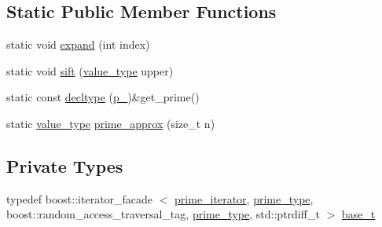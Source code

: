 \subsection*{\-Static \-Public \-Member \-Functions}
\begin{DoxyCompactItemize}
\item 
static void \hyperlink{classyuh_1_1range__detail_1_1prime__iterator_a58131fc2d184d593a3cd6825bca508ee}{expand} (int index)
\item 
static void \hyperlink{classyuh_1_1range__detail_1_1prime__iterator_a8919e76bca867296647318a8e6694b72}{sift} (\hyperlink{classyuh_1_1range__detail_1_1prime__iterator_aaa801ea9fe09398ea8c5beb1324edadf}{value\-\_\-type} upper)
\item 
static const \hyperlink{classyuh_1_1range__detail_1_1prime__iterator_a2f6d1185fb0a9c5645498e79db8e809b}{decltype} (\hyperlink{classyuh_1_1range__detail_1_1prime__iterator_aff6d0a0fbc14123c0fca5a0c05d2e68c}{p\-\_\-})\&get\-\_\-prime()
\item 
static \hyperlink{classyuh_1_1range__detail_1_1prime__iterator_aaa801ea9fe09398ea8c5beb1324edadf}{value\-\_\-type} \hyperlink{classyuh_1_1range__detail_1_1prime__iterator_ace7af2803e2a42c5c17c5e1210e91fa6}{prime\-\_\-approx} (size\-\_\-t n)
\end{DoxyCompactItemize}
\subsection*{\-Private \-Types}
\begin{DoxyCompactItemize}
\item 
typedef boost\-::iterator\-\_\-facade\*
$<$ \hyperlink{classyuh_1_1range__detail_1_1prime__iterator}{prime\-\_\-iterator}, \hyperlink{namespaceyuh_af542f8440602da42322ddb7ea8242336}{prime\-\_\-type}, \*
boost\-::random\-\_\-access\-\_\-traversal\-\_\-tag, \*
\hyperlink{namespaceyuh_af542f8440602da42322ddb7ea8242336}{prime\-\_\-type}, std\-::ptrdiff\-\_\-t $>$ \hyperlink{classyuh_1_1range__detail_1_1prime__iterator_af6bf48039295b29ac1f86bd776f4a29a}{base\-\_\-t}
\end{DoxyCompactItemize}
